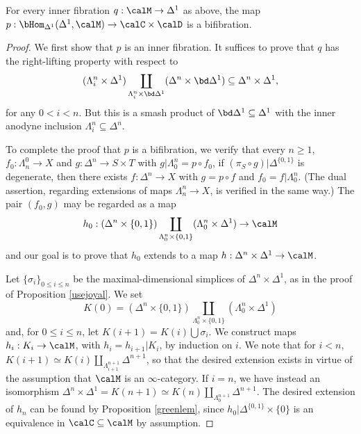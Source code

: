 \begin{proposition}\label{tweez}
For every inner fibration $q: \calM \rightarrow \Delta^1$ as above, the map
$p: \bHom_{\Delta^1}(\Delta^1, \calM) \rightarrow \calC \times \calD$ is a bifibration.
\end{proposition}

\begin{proof}
We first show that $p$ is an inner fibration. It suffices to prove
that $q$ has the right-lifting property with respect to
$$ ( \Lambda^n_i \times \Delta^1 ) \coprod_{ \Lambda^n_i \times
\bd \Delta^1 } (\Delta^n \times \bd \Delta^1) \subseteq \Delta^n
\times \Delta^1, $$ for any $0 < i < n$. But this is a smash
product of $\bd \Delta^1 \subseteq \Delta^1$ with the inner anodyne
inclusion $\Lambda^n_i \subseteq \Delta^n$.

To complete the proof that $p$ is a bifibration, we verify that
every $n\geq 1$, $f_0: \Lambda^0_n \rightarrow X$ and
$g: \Delta^n \rightarrow S \times T$ with $g|\Lambda^n_0 = p \circ f_0$, if 
$(\pi_S \circ g) | \Delta^{ \{0,1\} }$ is degenerate, then there exists
$f: \Delta^n \rightarrow X$ with $g= p \circ f$ and $f_0 = f | \Lambda^n_0$. (The dual assertion,
regarding extensions of maps $\Lambda^n_n \rightarrow X$, is verified in the same way.)
The pair $(f_0,g)$ may be regarded as a map
$$h_{0}: (\Delta^n \times \{0,1\}) \coprod_{ \Lambda^n_0 \times \{0,1\} } (\Lambda^n_0 \times \Delta^1)
\rightarrow \calM$$
and our goal is to prove that $h_0$ extends to a map $h: \Delta^n \times \Delta^1 \rightarrow \calM$. 

Let $\{ \sigma_i \}_{0 \leq i \leq n}$ be the maximal-dimensional simplices of $\Delta^n \times \Delta^1$, as in the proof of Proposition \ref{usejoyal}. We set $$K(0) = (\Delta^n \times \{0,1\}) \coprod_{ \Lambda^n_0 \times \{0,1\} } (\Lambda^n_0 \times \Delta^1)$$ and, for $0 \leq i \leq n$, let $K(i+1) = K(i) \bigcup \sigma_i$. We construct maps $h_i: K_i \rightarrow \calM$, with $h_{i} = h_{i+1} | K_{i}$, by induction on $i$.  We note that for $i < n$, $K(i+1) \simeq K(i) \coprod_{ \Lambda^{n+1}_{i+1} } \Delta^{n+1}$, so that the desired extension exists in virtue of the assumption that $\calM$ is an $\infty$-category. If $i = n$, we have instead an isomorphism $\Delta^n \times \Delta^1 = K(n+1) \simeq K(n) \coprod_{ \Lambda^{n+1}_0 } \Delta^{n+1}$. The desired extension of $h_n$ can be found by Proposition \ref{greenlem}, since $h_0 | \Delta^{ \{0,1\} } \times \{0\}$ is an equivalence in $\calC \subseteq \calM$ by assumption.
\end{proof}

